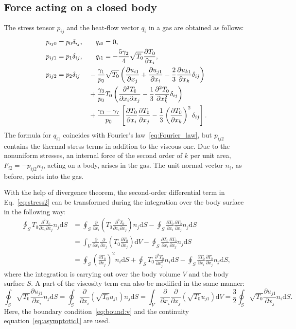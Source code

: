 \documentclass[smallextended, referee]{svjour3} %
\newcommand{\dd}{\mathrm{d}}
\newcommand{\pder}[2][]{\frac{\partial#1}{\partial#2}}
\newcommand{\pderdual}[2][]{\frac{\partial^2#1}{\partial#2^2}}
\newcommand{\pderder}[3][]{\frac{\partial^2#1}{\partial#2\partial#3}}
\begin{document}
\subsection{Force acting on a closed body}

The stress tensor \(p_{ij}\) and the heat-flow vector \(q_i\) in a gas are obtained as follows:
\begin{alignat}{2}
    p_{ij0} &= p_0\delta_{ij}, && \quad q_{i0} = 0, \label{eq:stress0}\\
    p_{ij1} &= p_1\delta_{ij}, && \quad q_{i1} = -\frac{5\gamma_2}4\sqrt{T_0}\pder[T_0]{x_i}, \label{eq:stress1}\\
    p_{ij2} &= p_2\delta_{ij}
                &&- \frac{\gamma_1}{p_0}\sqrt{T_0}\left(
                \pder[u_{i1}]{x_j} + \pder[u_{j1}]{x_i} - \frac23\pder[u_{k1}]{x_k}\delta_{ij}
            \right) \notag\\
        & &&+ \frac{\gamma_3}{p_0} T_0\left(
                \pderder[T_0]{x_i}{x_j} - \frac13\pderdual[T_0]{x_k}\delta_{ij}
            \right) \notag\\
        & &&+ \frac{\gamma_3 - \gamma_7}{p_0}\left[
                \pder[T_0]{x_i}\pder[T_0]{x_j} - \frac13\left(\pder[T_0]{x_k}\right)^2\delta_{ij}
            \right]. \label{eq:stress2}
\end{alignat}
The formula for \(q_{i1}\) coincides with Fourier's law~\eqref{eq:Fourier_law},
but \(p_{ij2}\) contains the thermal-stress terms in addition to the viscous one.
Due to the nonuniform stresses, an internal force of the second order of \(k\) per unit area,
\(F_{i2} = -p_{ij2}n_j\), acting on a body, arises in the gas.
The unit normal vector \(n_i\), as before, points into the gas.

With the help of divergence theorem, the second-order differential term in Eq.~\eqref{eq:stress2}
can be transformed during the integration over the body surface in the following way:
\begin{align*}
    \oint_S T_0\pderder[T_0]{x_i}{x_j} n_j\dd{S}
        &= \oint_S \pder{x_i} \left( T_0\pderder[T_0]{x_i}{x_j} \right) n_j\dd{S}
        - \oint_S \pder[T_0]{x_i}\pder[T_0]{x_j} n_j\dd{S} \\
        &= \int_V \pder{x_i}\pder{x_j} \left( T_0 \pder[T_0]{x_j} \right) \dd{V}
        - \oint_S \pder[T_0]{x_i}\pder[T_0]{x_j} n_j\dd{S} \\
        &= \oint_S \left(\pder[T_0]{x_j}\right)^2 n_i\dd{S}
        + \oint_S T_0\pderdual[T_0]{x_j} n_i\dd{S}
        - \oint_S \pder[T_0]{x_i}\pder[T_0]{x_j} n_j\dd{S},
\end{align*}
where the integration is carrying out over the body volume \(V\) and the body surface \(S\).
A part of the viscosity term can also be modified in the same manner:
\begin{equation*}
    \oint_S \sqrt{T_0}\pder[u_{j1}]{x_i} n_j\dd{S}
        = \oint_S \pder{x_i} \left( \sqrt{T_0} u_{j1} \right) n_j\dd{S}
        = \int_V \pder{x_i}\pder{x_j} \left( \sqrt{T_0} u_{j1} \right) \dd{V}
        = \frac{3}{2}\oint_S \sqrt{T_0} \pder[u_{j1}]{x_j} n_i\dd{S}.
\end{equation*}
Here, the boundary condition~\eqref{eq:bound:v} and the continuity equation~\eqref{eq:asymptotic1} are used.
\end{document}
